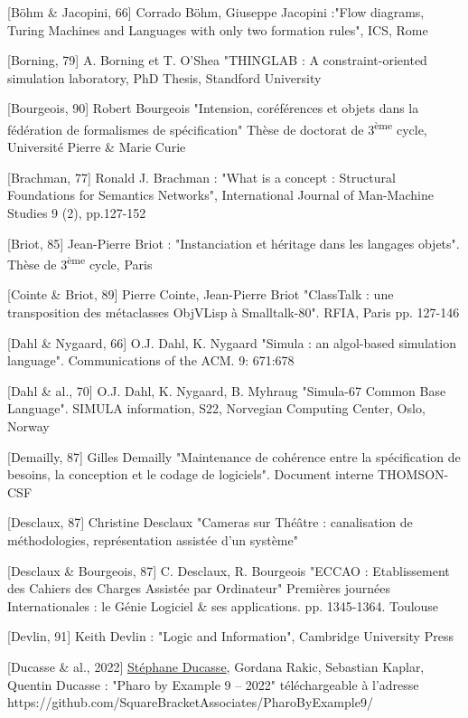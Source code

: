 \documentclass[a4paper, 12pt, openright, french]{book}
\begin{document}
{[}Böhm \& Jacopini, 66{]} Corrado Böhm, Giuseppe Jacopini :"Flow
diagrams, Turing Machines and Languages with only two formation rules",
ICS, Rome

{[}Borning, 79{]} A. Borning et T. O'Shea "THINGLAB : A
constraint-oriented simulation laboratory, PhD Thesis, Standford
University

{[}Bourgeois, 90{]} Robert Bourgeois "Intension, coréférences et objets
dans la fédération de formalismes de spécification" Thèse de doctorat de
3\textsuperscript{ème} cycle, Université Pierre \& Marie Curie

{[}Brachman, 77{]} Ronald J. Brachman : "What is a concept : Structural
Foundations for Semantics Networks", International Journal of
Man-Machine Studies 9 (2), pp.127-152

{[}Briot, 85{]} Jean-Pierre Briot : "Instanciation et héritage dans les
langages objets". Thèse de 3\textsuperscript{ème} cycle, Paris

{[}Cointe \& Briot, 89{]} Pierre Cointe, Jean-Pierre Briot "ClassTalk :
une transposition des métaclasses ObjVLisp à Smalltalk-80". RFIA, Paris
pp. 127-146

{[}Dahl \& Nygaard, 66{]} O.J. Dahl, K. Nygaard "Simula : an algol-based
simulation language". Communications of the ACM. 9: 671:678

{[}Dahl \& al., 70{]} O.J. Dahl, K. Nygaard, B. Myhraug "Simula-67
Common Base Language". SIMULA information, S22, Norvegian Computing
Center, Oslo, Norway

{[}Demailly, 87{]} Gilles Demailly "Maintenance de cohérence entre la
spécification de besoins, la conception et le codage de logiciels".
Document interne THOMSON-CSF

{[}Desclaux, 87{]} Christine Desclaux "Cameras sur Théâtre :
canalisation de méthodologies, représentation assistée
d'un système"

{[}Desclaux \& Bourgeois, 87{]} C. Desclaux, R. Bourgeois "ECCAO :
Etablissement des Cahiers des Charges Assistée par Ordinateur" Premières
journées Internationales : le Génie Logiciel \& ses applications. pp.
1345-1364. Toulouse

{[}Devlin, 91{]} Keith Devlin : "Logic and Information", Cambridge
University Press

{[}Ducasse \& al., 2022{]}
\href{http://stephane.ducasse.free.fr/}{Stéphane Ducasse}, Gordana
Rakic, Sebastian Kaplar, Quentin Ducasse : "Pharo by Example 9 -- 2022"
téléchargeable à l'adresse
https://github.com/SquareBracketAssociates/PharoByExample9/
\end{document}
